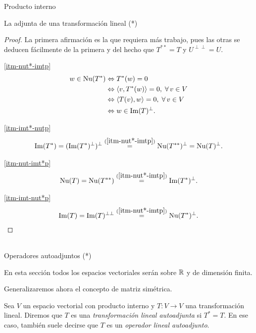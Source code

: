 \begin{chapter}{Producto interno}
\begin{section}{La adjunta de una transformaci\'on lineal (*)}
        \begin{proof}
            La primera afirmación es la que requiera más trabajo, pues las otras se deducen fácilmente de la primera y del hecho que $T^{**} = T$ y $U^{\perp\perp} = U$. 

          \ref{itm-nut*-imtp}
            \begin{align*}
            w \in  \operatorname{Nu}(T^*) &\Leftrightarrow T^*(w) =0 \\&\Leftrightarrow \langle v, T^*(w) \rangle = 0,\; \forall\, v\in V  \\&\Leftrightarrow \langle T(v), w \rangle = 0,\; \forall\, v\in V\\&\Leftrightarrow  w \in \operatorname{Im}(T)^\perp.
            \end{align*}

           \ref{itm-imt*-nutp}
            \begin{align*}
                \operatorname{Im}(T^*) = (\operatorname{Im}(T^*)^{\perp})^{\perp} \stackrel{(\ref{itm-nut*-imtp})}{=}    \operatorname{Nu}(T^{**})^{\perp} = \operatorname{Nu}(T)^{\perp}.
            \end{align*}

          \ref{itm-nut-imt*p}
            \begin{align*}
                \operatorname{Nu}(T) = \operatorname{Nu}(T^{**}) \stackrel{(\ref{itm-nut*-imtp})}{=}  \operatorname{Im}(T^*)^\perp.
            \end{align*}

           \ref{itm-imt-nut*p}
            \begin{align*}
                \operatorname{Im}(T) = \operatorname{Im}(T)^{\perp\perp}  \stackrel{(\ref{itm-nut*-imtp})}{=}  \operatorname{Nu}(T^*)^\perp.
            \end{align*}
        \end{proof}
        
        ${}^{}$

        
    \end{section}



    \begin{section}{Operadores autoadjuntos (*)}\label{secccion-operadores-autoadjuntos}

        En esta sección todos los espacios vectoriales serán sobre $\mathbb R$ y de dimensión finita. 

        Generalizaremos ahora el concepto de matriz simétrica. 
        
        \begin{definicion}
            Sea $V$ un espacio vectorial con producto interno y $T: V \to V$ una transformación lineal. Diremos que $T$ es una \textit{transformación lineal autoadjunta} si $T^* = T$. En  ese caso, también suele decirse que $T$ es un \textit{operador lineal autoadjunto}.
        \end{definicion}
        

\end{section}
\end{chapter}

